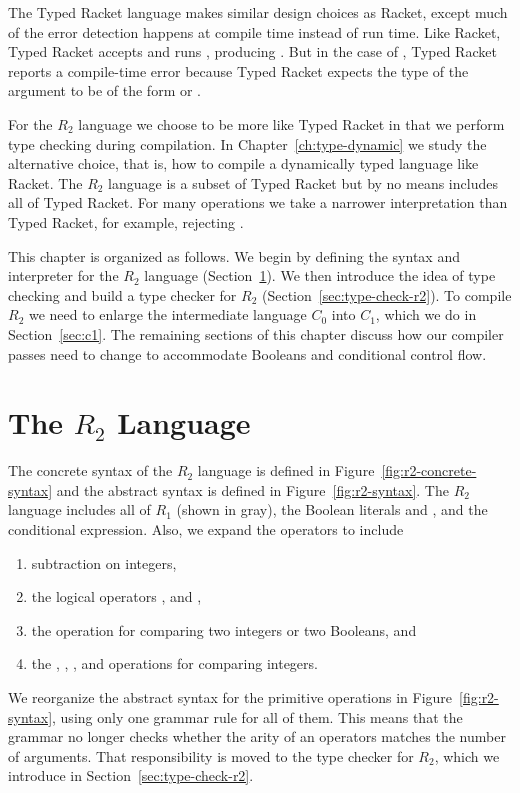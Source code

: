\documentclass[11pt]{book}
\begin{document}
The Typed Racket language makes similar design choices as Racket,
except much of the error detection happens at compile time instead of
run time. Like Racket, Typed Racket accepts and runs ,
producing . But in the case of , Typed Racket
reports a compile-time error because Typed Racket expects the type of
the argument to be of the form  or .

For the $R_2$ language we choose to be more like Typed Racket in that
we perform type checking during compilation. In
Chapter~\ref{ch:type-dynamic} we study the alternative choice, that
is, how to compile a dynamically typed language like Racket.  The
$R_2$ language is a subset of Typed Racket but by no means includes
all of Typed Racket. For many operations we take a narrower
interpretation than Typed Racket, for example, rejecting .

This chapter is organized as follows.  We begin by defining the syntax
and interpreter for the $R_2$ language (Section~\ref{sec:r2-lang}). We
then introduce the idea of type checking and build a type checker for
$R_2$ (Section~\ref{sec:type-check-r2}). To compile $R_2$ we need to
enlarge the intermediate language $C_0$ into $C_1$, which we do in
Section~\ref{sec:c1}. The remaining sections of this chapter discuss
how our compiler passes need to change to accommodate Booleans and
conditional control flow.


\section{The $R_2$ Language}
\label{sec:r2-lang}

The concrete syntax of the $R_2$ language is defined in
Figure~\ref{fig:r2-concrete-syntax} and the abstract syntax is defined
in Figure~\ref{fig:r2-syntax}. The $R_2$ language includes all of
$R_1$ (shown in gray), the Boolean literals  and ,
and the conditional  expression. Also, we expand the
operators to include
\begin{enumerate}
\item subtraction on integers,
\item the logical operators ,  and ,
\item the  operation for comparing two integers or two Booleans, and
\item the \key{<}, \key{<=}, \key{>}, and \key{>=} operations for
  comparing integers.
\end{enumerate}
We reorganize the abstract syntax for the primitive operations in
Figure~\ref{fig:r2-syntax}, using only one grammar rule for all of
them. This means that the grammar no longer checks whether the arity
of an operators matches the number of arguments. That responsibility
is moved to the type checker for $R_2$, which we introduce in
Section~\ref{sec:type-check-r2}.
\end{document}
